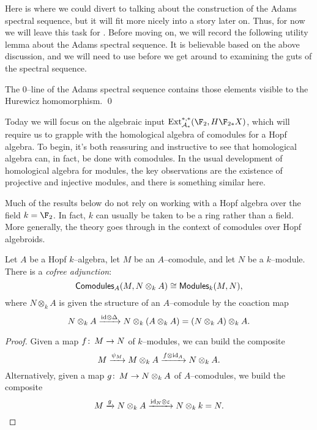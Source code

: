 Here is where we could divert to talking about the construction of the Adams spectral sequence, but it will fit more nicely into a story later on.  Thus, for now we will leave this task for .  Before moving on, we will record the following utility lemma about the Adams spectral sequence.  It is believable based on the above discussion, and we will need to use before we get around to examining the guts of the spectral sequence.
\begin{lemma}\label{HurewiczImageOnZeroLine}
The $0$--line of the Adams spectral sequence contains those elements visible to the Hurewicz homomorphism. \qed {}
\end{lemma}

Today we will focus on the algebraic input $\Ext_{\mathcal A_*}^{*, *}(\F_2, H\F_{2*} X)$, which will require us to grapple with the homological algebra of comodules for a Hopf algebra.  To begin, it's both reassuring and instructive to see that homological algebra can, in fact, be done with comodules.  In the usual development of homological algebra for modules, the key observations are the existence of projective and injective modules, and there is something similar here.

\begin{remark}
Much of the results below do not rely on working with a Hopf algebra over the field $k = \F_2$.  In fact, $k$ can usually be taken to be a ring rather than a field. More generally, the theory goes through in the context of comodules over Hopf algebroids.
\end{remark}

\begin{lemma}
Let $A$ be a Hopf $k$--algebra, let $M$ be an $A$--comodule, and let $N$ be a $k$--module.  There is a \textit{cofree adjunction}: \[\mathsf{Comodules}_A(M, N \otimes_k A) \cong \mathsf{Modules}_k(M, N),\] where $N \otimes_k A$ is given the structure of an $A$--comodule by the coaction map \[N \otimes_k A \xrightarrow{\mathrm{id} \otimes \Delta} N \otimes_k (A \otimes_k A) = (N \otimes_k A) \otimes_k A.\]
\end{lemma}
\begin{proof}
Given a map $f\colon\thinspace M \to N$ of $k$--modules, we can build the composite \[M \xrightarrow{\psi_M} M \otimes_k A \xrightarrow{f \otimes \mathrm{id}_A} N \otimes_k A.\]  Alternatively, given a map $g\colon\thinspace M \to N \otimes_k A$ of $A$--comodules, we build the composite \[M \xrightarrow{g} N \otimes_k A \xrightarrow{\mathrm{id}_N \otimes \varepsilon} N \otimes_k k = N. \qedhere\]
\end{proof}

